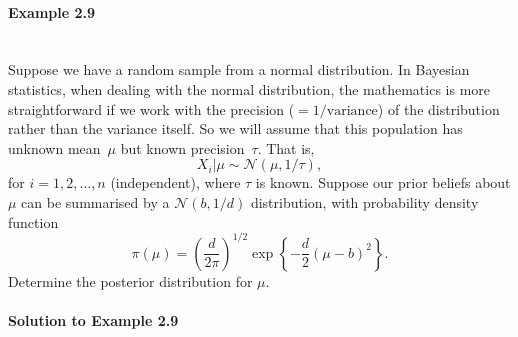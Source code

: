 \paragraph{Example 2.9}{\label{ex:normal}~\\
Suppose we have a random sample from a normal distribution. In Bayesian statistics, when dealing with the normal distribution, the mathematics is more straightforward if we work with the precision ($=1/\text{variance}$) of the distribution rather than the variance itself. So we will assume that this population has unknown mean~$\mu$ but known precision~$\tau$. That is, 
$$X_i|\mu\sim \mathcal{N}(\mu,1/\tau),$$
for $i=1,2,\ldots,n$ (independent), where $\tau$ is known. Suppose our prior beliefs about $\mu$ can be summarised by a $\mathcal{N}(b,1/d)$ distribution, with probability density function
\begin{equation}
\label{eq:p11}
\pi(\mu)=
\left(\frac{d}{2\pi}\right)^{1/2}\exp\left\{-\frac{d}{2}(\mu-b)^2\right\}.
\end{equation}
Determine the posterior distribution for $\mu$. 

\paragraph{Solution to Example 2.9}{
    
        
    
}

\newpage

{
    
}}
